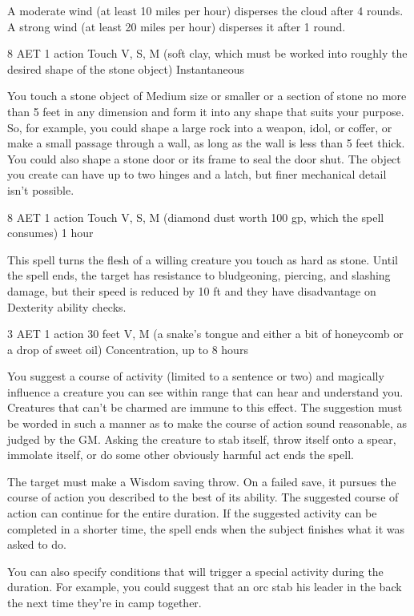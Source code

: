 A moderate wind (at least 10 miles per hour) disperses the cloud after 4 rounds. A strong wind (at least 20 miles per hour) disperses it after 1 round.


{8 AET}
{1 action}
{Touch}
{V, S, M (soft clay, which must be worked into roughly the desired shape of the stone object)}
{Instantaneous}

You touch a stone object of Medium size or smaller or a section of stone no more than 5 feet in any dimension and form it into any shape that suits your purpose. So, for example, you could shape a large rock into a weapon, idol, or coffer, or make a small passage through a wall, as long as the wall is less than 5 feet thick. You could also shape a stone door or its frame to seal the door shut. The object you create can have up to two hinges and a latch, but finer mechanical detail isn't possible.


{8 AET}
{1 action}
{Touch}
{V, S, M (diamond dust worth 100 gp, which the spell consumes)}
{1 hour}

This spell turns the flesh of a willing creature you touch as hard as stone. Until the spell ends, the target has resistance to bludgeoning, piercing, and slashing damage, but their speed is reduced by 10 ft and they have disadvantage on Dexterity ability checks.


{3 AET}
{1 action}
{30 feet}
{V, M (a snake's tongue and either a bit of honeycomb or a drop of sweet oil)}
{Concentration, up to 8 hours}

You suggest a course of activity (limited to a sentence or two) and magically influence a creature you can see within range that can hear and understand you. Creatures that can't be charmed are immune to this effect. The suggestion must be worded in such a manner as to make the course of action sound reasonable, as judged by the GM. Asking the creature to stab itself, throw itself onto a spear, immolate itself, or do some other obviously harmful act ends the spell.

The target must make a Wisdom saving throw. On a failed save, it pursues the course of action you described to the best of its ability. The suggested course of action can continue for the entire duration. If the suggested activity can be completed in a shorter time, the spell ends when the subject finishes what it was asked to do.

You can also specify conditions that will trigger a special activity during the duration. For example, you could suggest that an orc stab his leader in the back the next time they're in camp together.

